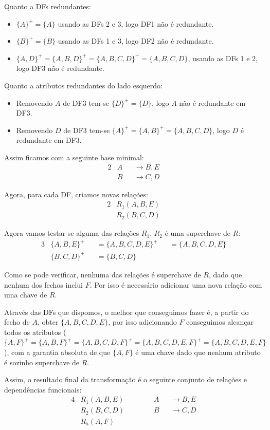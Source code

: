 \documentclass[type=normal, year=2014/15]{bdad_exam}
\begin{document}
{Quanto a DFs redundantes:
\begin{itemize}
    \item $\{A\}^+ = \{A\}$ usando as DFs 2 e 3, logo DF1 não é redundante.
    \item $\{B\}^+ = \{B\}$ usando as DFs 1 e 3, logo DF2 não é redundante.
    \item $\{A,D\}^+ = \{A,B,D\}^+ = \{A,B,C,D\}^+ = \{A,B,C,D\}$, usando as DFs 1 e 2, logo DF3 não é redundante.
\end{itemize}
Quanto a atributos redundantes do lado esquerdo:
\begin{itemize}
    \item Removendo $A$ de DF3 tem-se $\{D\}^+ = \{D\}$, logo $A$ não é redundante em DF3.
    \item Removendo $D$ de DF3 tem-se $\{A\}^+ = \{A,B\}^+ = \{A,B,C,D\}$, logo $D$ é redundante em DF3.
\end{itemize}
Assim ficamos com a seguinte base minimal:
\begin{alignat*}{2}
    & A && \rightarrow B, E \\
    & B && \rightarrow C, D
\end{alignat*}

Agora, para cada DF, criamos novas relações:
\begin{alignat*}{2}
    & R_1 (A, B, E) \\
    & R_2 (B, C, D)
\end{alignat*}

Agora vamos testar se alguma das relações $R_1$, $R_2$ é uma superchave de $R$:
\begin{alignat*}{3}
    & \{A, B, E\}^+ &&= \{A, B, C, D, E\}^+ &&= \{A,B,C,D,E\} \\
    & \{B, C, D\}^+ &&= \{B, C, D\}         &&
\end{alignat*}

Como se pode verificar, nenhuma das relações é superchave de $R$, dado que nenhum dos fechos inclui $F$. Por isso é necessário adicionar uma nova relação com uma chave de $R$.

Através das DFs que dispomos, o melhor que conseguimos fazer é, a partir do fecho de $A$, obter $\{A, B, C, D, E\}$, por isso adicionando $F$ conseguimos alcançar todos os atributos ($\{A,F\}^+ = \{A,B,F\}^+ = \{A,B,C,D,F\}^+ = \{A,B,C,D,E,F\}^+ = \{A,B,C,D,E,F\}$), com a garantia absoluta de que $\{A,F\}$ é uma chave dado que nenhum atributo é sozinho superchave de $R$.

Assim, o resultado final da transformação é o seguinte conjunto de relações e dependências funcionais:
\begin{alignat*}{4}
    & R_1 (A, B, E) &&~~~~&& A && \rightarrow B, E\\
    & R_2 (B, C, D) &&~~~~&& B && \rightarrow C, D\\
    & R_5 (A, F)
\end{alignat*}

}
\end{document}
